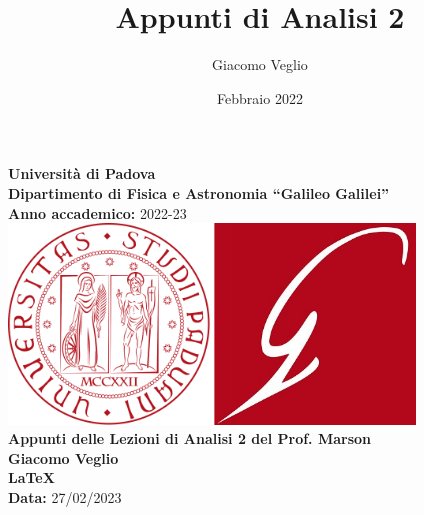 \documentclass{article}
\title{Appunti di Analisi 2}
\author{Giacomo Veglio}
\date{Febbraio 2022}
\begin{document}
\begin{titlepage}
    \begin{center}
        
        \Large\textbf{Università di Padova} \\
        \large\textbf{Dipartimento di Fisica e Astronomia “Galileo Galilei”}\\
        \textbf{Anno accademico:} 2022-23\\
        \vspace{30pt}
        \includegraphics[width=0.4\textwidth]{UniPdlogo.png}
        \hspace{30pt}
        \includegraphics[width=0.4\textwidth]{DFALogo.jpg}\\
        \vspace{30pt} \hline
        \vspace{15pt}
        \large\textbf{Appunti delle Lezioni di Analisi 2 del Prof. Marson}\\
        \vspace{15pt}
        \hline
        \vspace{30pt}
        \textbf{Giacomo Veglio}\\
        \vspace{15pt}
        \textbf{La\TeX}\\
        \vspace{15pt}
        \textbf{Data:} 27/02/2023\\
        \vspace{15pt}
        \begin{figure}[h!]

\end{figure}
\end{center}
\end{titlepage}
\end{document}
